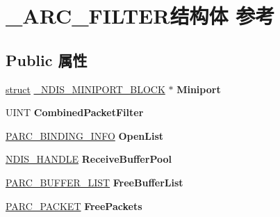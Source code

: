 \hypertarget{struct___a_r_c___f_i_l_t_e_r}{}\section{\+\_\+\+A\+R\+C\+\_\+\+F\+I\+L\+T\+E\+R结构体 参考}
\label{struct___a_r_c___f_i_l_t_e_r}
\subsection*{Public 属性}
\begin{DoxyCompactItemize}
\item 
\mbox{\label{struct___a_r_c___f_i_l_t_e_r_a080533e5545dcd6f917761124819765b}} 
\hyperlink{interfacestruct}{struct} \hyperlink{struct___n_d_i_s___m_i_n_i_p_o_r_t___b_l_o_c_k}{\+\_\+\+N\+D\+I\+S\+\_\+\+M\+I\+N\+I\+P\+O\+R\+T\+\_\+\+B\+L\+O\+CK} $\ast$ {\bfseries Miniport}
\item 
\mbox{\label{struct___a_r_c___f_i_l_t_e_r_aab2e8651a197f27c8e3c6036c2034780}} 
U\+I\+NT {\bfseries Combined\+Packet\+Filter}
\item 
\mbox{\label{struct___a_r_c___f_i_l_t_e_r_a2415fc6508094b82eeaf421a48a88753}} 
\hyperlink{struct___a_r_c___b_i_n_d_i_n_g___i_n_f_o}{P\+A\+R\+C\+\_\+\+B\+I\+N\+D\+I\+N\+G\+\_\+\+I\+N\+FO} {\bfseries Open\+List}
\item 
\mbox{\label{struct___a_r_c___f_i_l_t_e_r_a3188334f30e0c07f4cc4028b1e21f2c9}} 
\hyperlink{interfacevoid}{N\+D\+I\+S\+\_\+\+H\+A\+N\+D\+LE} {\bfseries Receive\+Buffer\+Pool}
\item 
\mbox{\label{struct___a_r_c___f_i_l_t_e_r_ac9dec73af7ee7377640064b0ad5d48a1}} 
\hyperlink{struct___a_r_c___b_u_f_f_e_r___l_i_s_t}{P\+A\+R\+C\+\_\+\+B\+U\+F\+F\+E\+R\+\_\+\+L\+I\+ST} {\bfseries Free\+Buffer\+List}
\item 
\mbox{\label{struct___a_r_c___f_i_l_t_e_r_aa9c07a066a2fcf648ab652f322b01c69}} 
\hyperlink{struct___a_r_c___p_a_c_k_e_t}{P\+A\+R\+C\+\_\+\+P\+A\+C\+K\+ET} {\bfseries Free\+Packets}
\item 
\mbox{\label{struct___a_r_c___f_i_l_t_e_r_ab72621abd172775550e89268ed7219cd}} 

\end{DoxyCompactItemize}
